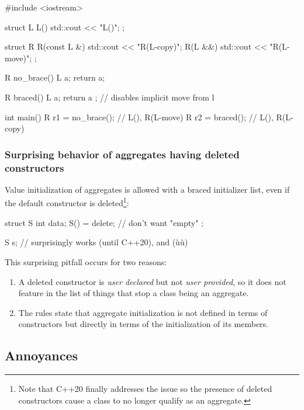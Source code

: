 \begin{emcppslisting}
#include <iostream>

struct L
{
    L()        { std::cout << "L()\n"; }
};

struct R
{
    R(const L &) { std::cout << "R(L-copy)\n"; }
    R(L &&)      { std::cout << "R(L-move)\n"; }
};

R no_brace()
{
    L a;
    return a;
}

R braced()
{
    L a;
    return { a };  // disables implicit move from l
}

int main()
{
    R r1 = no_brace();  // L(), R(L-move)
    R r2 = braced();    // L(), R(L-copy)
}
\end{emcppslisting}


\subsubsection[Surprising behavior of aggregates having deleted constructors]{Surprising behavior of aggregates having deleted constructors}\label{surprising-behavior-of-aggregates-having-deleted-constructors}

Value initialization of aggregates is allowed with a braced initializer
list, even if the default constructor is deleted{\cprotect\footnote{Note
that C++20 finally addresses the issue so the presence of deleted
  constructors cause a class to no longer qualify as an aggregate.}}:

\begin{emcppslisting}
struct S
{
    int data;
    S() = delete; // don't want "empty"
};

S s{}; // surprisingly works (until C++20), and (ù{}ù)
\end{emcppslisting}

\noindent This surprising pitfall occurs for two reasons:
\begin{enumerate}
\item{A deleted constructor is \emph{user declared} but not \emph{user provided}, so it does not feature in the list of things that stop a class being an aggregate.}
\item{The rules state that aggregate initialization is not defined in terms of constructors but directly in terms of the initialization of its members.}
\end{enumerate}

\subsection[Annoyances]{Annoyances}\label{annoyances}

